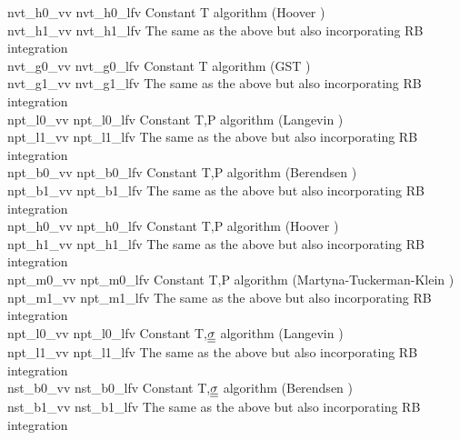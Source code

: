 \begin{tabbing}
{\sc nvt\_h0\_vv}     \> {\sc nvt\_h0\_lfv} \> Constant T algorithm (Hoover \cite{hoover-85a}) \\
{\sc nvt\_h1\_vv}     \> {\sc nvt\_h1\_lfv} \> The same as the above but also incorporating RB integration \\
{\sc nvt\_g0\_vv}     \> {\sc nvt\_g0\_lfv} \> Constant T algorithm (GST \cite{leimkuhler-09a}) \\
{\sc nvt\_g1\_vv}     \> {\sc nvt\_g1\_lfv} \> The same as the above but also incorporating RB integration \\
{\sc npt\_l0\_vv}     \> {\sc npt\_l0\_lfv} \> Constant T,P algorithm (Langevin \cite{quigley-04a}) \\
{\sc npt\_l1\_vv}     \> {\sc npt\_l1\_lfv} \> The same as the above but also incorporating RB integration \\
{\sc npt\_b0\_vv}     \> {\sc npt\_b0\_lfv} \> Constant T,P algorithm (Berendsen \cite{berendsen-84a}) \\
{\sc npt\_b1\_vv}     \> {\sc npt\_b1\_lfv} \> The same as the above but also incorporating RB integration \\
{\sc npt\_h0\_vv}     \> {\sc npt\_h0\_lfv} \> Constant T,P algorithm (Hoover \cite{hoover-85a}) \\
{\sc npt\_h1\_vv}     \> {\sc npt\_h1\_lfv} \> The same as the above but also incorporating RB integration \\
{\sc npt\_m0\_vv}     \> {\sc npt\_m0\_lfv} \> Constant T,P algorithm (Martyna-Tuckerman-Klein \cite{martyna-96a}) \\
{\sc npt\_m1\_vv}     \> {\sc npt\_m1\_lfv} \> The same as the above but also incorporating RB integration \\
{\sc npt\_l0\_vv}     \> {\sc npt\_l0\_lfv} \> Constant T,$\mbox{$\underline{\underline{\bf \sigma}}$}$ algorithm (Langevin \cite{quigley-04a}) \\
{\sc npt\_l1\_vv}     \> {\sc npt\_l1\_lfv} \> The same as the above but also incorporating RB integration \\
{\sc nst\_b0\_vv}     \> {\sc nst\_b0\_lfv} \> Constant T,$\mbox{$\underline{\underline{\bf \sigma}}$}$ algorithm (Berendsen \cite{berendsen-84a}) \\
{\sc nst\_b1\_vv}     \> {\sc nst\_b1\_lfv} \> The same as the above but also incorporating RB integration \\

\end{tabbing}
